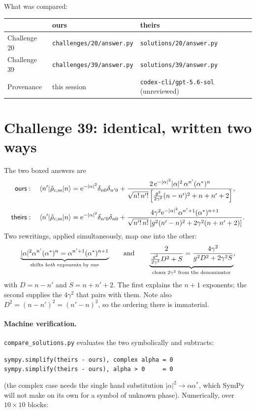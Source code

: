\documentclass[11pt,a4paper]{article}
\newcommand{\ee}{\mathrm{e}}
\newcommand{\ours}{\textsf{ours}}
\newcommand{\theirs}{\textsf{theirs}}
\begin{document}
\noindent
What was compared:
\begin{center}\small
\begin{tabular}{lll}
\toprule
& \ours & \theirs \\
\midrule
Challenge 20 & \texttt{challenges/20/answer.py} & \texttt{solutions/20/answer.py} \\
Challenge 39 & \texttt{challenges/39/answer.py} & \texttt{solutions/39/answer.py} \\
Provenance   & this session & \texttt{codex-cli/gpt-5.6-sol} (unreviewed) \\
\bottomrule
\end{tabular}
\end{center}

\section{Challenge 39: identical, written two ways}
\label{sec:39}

The two boxed answers are
\begin{align}
  \ours:\quad
  \langle n'|\hat\rho_{c,\rm ss}|n\rangle
  &=\ee^{-|\alpha|^{2}}\delta_{n0}\delta_{n'0}
   +\frac{2\,\ee^{-|\alpha|^{2}}|\alpha|^{2}\,\alpha^{n'}(\alpha^{*})^{n}}
         {\sqrt{n!\,n'!}\left[\frac{g^{2}}{2\gamma^{2}}(n-n')^{2}+n+n'+2\right]},
  \label{eq:ours39}\\[4pt]
  \theirs:\quad
  \langle n'|\hat\rho_{c,\rm ss}|n\rangle
  &=\ee^{-|\alpha|^{2}}\delta_{n'0}\delta_{n0}
   +\frac{4\gamma^{2}\ee^{-|\alpha|^{2}}\alpha^{n'+1}(\alpha^{*})^{n+1}}
         {\sqrt{n'!\,n!}\left[g^{2}(n'-n)^{2}+2\gamma^{2}(n+n'+2)\right]}.
  \label{eq:theirs39}
\end{align}
Two rewritings, applied simultaneously, map one into the other:
\begin{equation}
  \underbrace{|\alpha|^{2}\alpha^{n'}(\alpha^{*})^{n}
  =\alpha^{n'+1}(\alpha^{*})^{n+1}}_{\text{shifts \emph{both} exponents by one}}
  \qquad\text{and}\qquad
  \underbrace{\frac{2}{\frac{g^{2}}{2\gamma^{2}}D^{2}+S}
  =\frac{4\gamma^{2}}{g^{2}D^{2}+2\gamma^{2}S}}_{\text{clears }2\gamma^{2}
  \text{ from the denominator}},
\end{equation}
with $D=n-n'$ and $S=n+n'+2$.  The first explains the $n+1$ exponents; the
second supplies the $4\gamma^{2}$ that pairs with them.  Note also
$D^{2}=(n-n')^{2}=(n'-n)^{2}$, so the ordering there is immaterial.

\paragraph{Machine verification.}
\texttt{compare\_solutions.py} evaluates the two symbolically and subtracts:
\begin{center}\small
\texttt{sympy.simplify(theirs - ours), complex alpha = 0}\\
\texttt{sympy.simplify(theirs - ours), alpha > 0\ \ \ \ \ = 0}
\end{center}
(the complex case needs the single hand substitution
$|\alpha|^{2}\to\alpha\alpha^{*}$, which SymPy will not make on its own for a
symbol of unknown phase).  Numerically, over $10\times10$ blocks:
\end{document}
